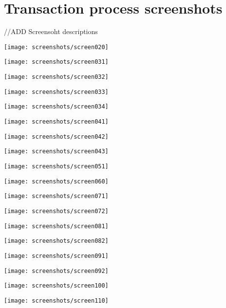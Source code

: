 \section{Transaction process screenshots}\label{sec:appendix-screenshots}

//ADD Screensoht descriptions

    \centerline{\texttt{[image: screenshots/screen020]}}
    \centerline{\texttt{[image: screenshots/screen031]}}
    \centerline{\texttt{[image: screenshots/screen032]}}
    \centerline{\texttt{[image: screenshots/screen033]}}
    \centerline{\texttt{[image: screenshots/screen034]}}
    \centerline{\texttt{[image: screenshots/screen041]}}
    \centerline{\texttt{[image: screenshots/screen042]}}
    \centerline{\texttt{[image: screenshots/screen043]}}
    \centerline{\texttt{[image: screenshots/screen051]}}
    \centerline{\texttt{[image: screenshots/screen060]}}
    \centerline{\texttt{[image: screenshots/screen071]}}
    \centerline{\texttt{[image: screenshots/screen072]}}
    \centerline{\texttt{[image: screenshots/screen081]}}
    \centerline{\texttt{[image: screenshots/screen082]}}
    \centerline{\texttt{[image: screenshots/screen091]}}
    \centerline{\texttt{[image: screenshots/screen092]}}
    \centerline{\texttt{[image: screenshots/screen100]}}
    \centerline{\texttt{[image: screenshots/screen110]}}
    

